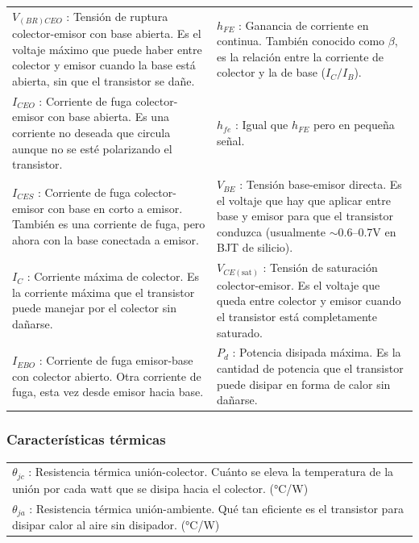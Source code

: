 \documentclass[chaptersright]{informeutn}
\begin{document}
\begin{tabular}{p{7cm} p{7cm}}
    $V_{(BR)CEO}$ : Tensión de ruptura colector-emisor con base abierta. Es el voltaje máximo que puede haber entre colector y emisor cuando la base está abierta, sin que el transistor se dañe. &
    $h_{FE}$ : Ganancia de corriente en continua. También conocido como $\beta$, es la relación entre la corriente de colector y la de base ($I_C/I_B$). \\
    
    $I_{CEO}$ : Corriente de fuga colector-emisor con base abierta. Es una corriente no deseada que circula aunque no se esté polarizando el transistor. &
    $h_{fe}$ : Igual que $h_{FE}$ pero en pequeña señal. \\
    
    $I_{CES}$ : Corriente de fuga colector-emisor con base en corto a emisor. También es una corriente de fuga, pero ahora con la base conectada a emisor. &
    $V_{BE}$ : Tensión base-emisor directa. Es el voltaje que hay que aplicar entre base y emisor para que el transistor conduzca (usualmente $\sim$0.6–0.7V en BJT de silicio). \\
    
    $I_C$ : Corriente máxima de colector. Es la corriente máxima que el transistor puede manejar por el colector sin dañarse. &
    $V_{CE(\text{sat})}$ : Tensión de saturación colector-emisor. Es el voltaje que queda entre colector y emisor cuando el transistor está completamente saturado. \\
    
    $I_{EBO}$ : Corriente de fuga emisor-base con colector abierto. Otra corriente de fuga, esta vez desde emisor hacia base. &
    $P_d$ : Potencia disipada máxima. Es la cantidad de potencia que el transistor puede disipar en forma de calor sin dañarse. \\
\end{tabular}

\vspace{1em}
\subsubsection{Características térmicas}

\begin{tabular}{p{14cm}}
    $\theta_{jc}$ : Resistencia térmica unión-colector. Cuánto se eleva la temperatura de la unión por cada watt que se disipa hacia el colector. (°C/W) \\
    $\theta_{ja}$ : Resistencia térmica unión-ambiente. Qué tan eficiente es el transistor para disipar calor al aire sin disipador. (°C/W) \\
\end{tabular}
\end{document}
